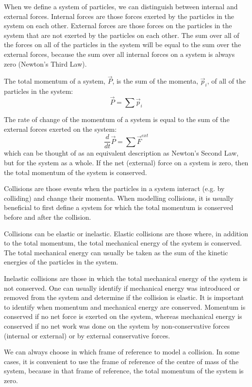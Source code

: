 \documentclass[9pt,arxiv,red]{lapreprint}
\begin{document}
When we define a system of particles, we can distinguish between internal and external forces. Internal forces are those forces exerted by the particles in the system on each other. External forces are those forces on the particles in the system that are not exerted by the particles on each other. The sum over all of the forces on all of the particles in the system will be equal to the sum over the external forces, because the sum over all internal forces on a system is always zero (Newton's Third Law).

The total momentum of a system, $\vec P$, is the sum of the momenta, $\vec p_i$, of all of the particles in the system:
\begin{equation}
\vec P = \sum \vec p_i
\end{equation}

The rate of change of the momentum of a system is equal to the sum of the external forces exerted on the system:
\begin{equation}
\frac{d}{dt}\vec P = \sum \vec F^{ext}
\end{equation}
which can be thought of as an equivalent description as Newton's Second Law, but for the system as a whole. If the net (external) force on a system is zero, then the total momentum of the system is conserved.

Collisions are those events when the particles in a system interact (e.g. by colliding) and change their momenta. When modelling collisions, it is usually beneficial to first define a system for which the total momentum is conserved before and after the collision.

Collisions can be elastic or inelastic. Elastic collisions are those where, in addition to the total momentum, the total mechanical energy of the system is conserved. The total mechanical energy can usually be taken as the sum of the kinetic energies of the particles in the system.

Inelastic collisions are those in which the total mechanical energy of the system is not conserved. One can usually identify if mechanical energy was introduced or removed from the system and determine if the collision is elastic. It is important to identify when momentum and mechanical energy are conserved. Momentum is conserved if no net force is exerted on the system, whereas mechanical energy is conserved if no net work was done on the system by non-conservative forces (internal or external) or by external conservative forces.

We can always choose in which frame of reference to model a collision. In some cases, it is convenient to use the frame of reference of the centre of mass of the system, because in that frame of reference, the total momentum of the system is zero.
\end{document}
